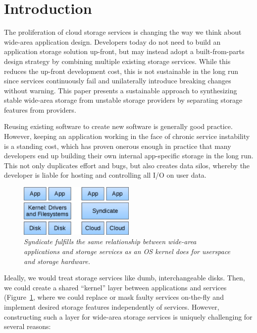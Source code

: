 \section{Introduction}
\label{sec:introduction}

The proliferation of cloud storage services is changing the way we think about
wide-area application design. Developers today do not need to build an
application storage solution up-front, but may instead adopt a built-from-parts
design strategy by combining multiple existing storage services. While this
reduces the up-front development cost, this is not sustainable in the long run
since services continuously fail and unilaterally introduce breaking changes
without warning. This paper presents a sustainable approach to synthesizing
stable wide-area storage from unstable storage providers by separating storage
features from providers.

Reusing existing software to create new software is generally good practice.
However, keeping an application working in the face of chronic service
instability is a standing cost, which has proven onerous enough in practice that
many developers end up building their own internal app-specific storage in the
long run. This not only duplicates effort and bugs, but also creates data silos,
whereby the developer is liable for hosting and controlling all I/O on user
data.

\begin{figure}[h!]
\centering
\includegraphics[width=0.5\textwidth]{figures/kernel}
\caption{\it Syndicate fulfills the same relationship between wide-area
applications and storage services as an OS kernel does for userspace and storage
hardware. }
\label{fig:kernel}
\end{figure}

Ideally, we would treat storage services like dumb, interchangeable disks. Then,
we could create a shared ``kernel'' layer between applications and services
(Figure~\ref{fig:kernel}, where we could replace or mask faulty services
on-the-fly and implement desired storage features independently of services.
However, constructing such a layer for wide-area storage services is uniquely
challenging for several reasons:



